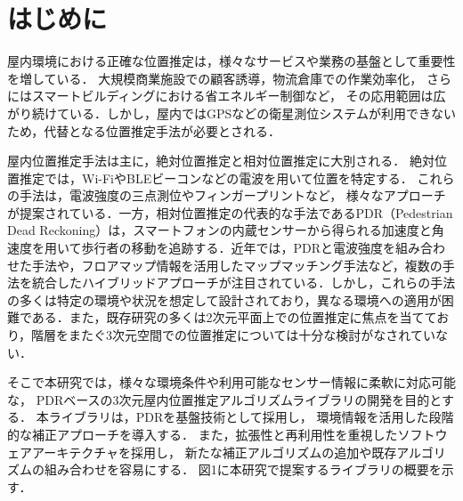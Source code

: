\documentclass[a4paper, 10pt, twocolumn]{jarticle}
\begin{document}


\section{はじめに}

屋内環境における正確な位置推定は，様々なサービスや業務の基盤として重要性を増している．
大規模商業施設での顧客誘導，物流倉庫での作業効率化，
さらにはスマートビルディングにおける省エネルギー制御など，
その応用範囲は広がり続けている．しかし，屋内ではGPSなどの衛星測位システムが利用できないため，代替となる位置推定手法が必要とされる．

屋内位置推定手法は主に，絶対位置推定と相対位置推定に大別される．
絶対位置推定では，Wi-FiやBLEビーコンなどの電波を用いて位置を特定する．
これらの手法は，電波強度の三点測位やフィンガープリントなど，
様々なアプローチが提案されている．一方，相対位置推定の代表的な手法であるPDR（Pedestrian Dead Reckoning）は，スマートフォンの内蔵センサーから得られる加速度と角速度を用いて歩行者の移動を追跡する．近年では，PDRと電波強度を組み合わせた手法や，フロアマップ情報を活用したマップマッチング手法など，複数の手法を統合したハイブリッドアプローチが注目されている．しかし，これらの手法の多くは特定の環境や状況を想定して設計されており，異なる環境への適用が困難である．また，既存研究の多くは2次元平面上での位置推定に焦点を当てており，階層をまたぐ3次元空間での位置推定については十分な検討がなされていない．

そこで本研究では，様々な環境条件や利用可能なセンサー情報に柔軟に対応可能な，
PDRベースの3次元屋内位置推定アルゴリズムライブラリの開発を目的とする．
本ライブラリは，PDRを基盤技術として採用し，
環境情報を活用した段階的な補正アプローチを導入する．
また，拡張性と再利用性を重視したソフトウェアアーキテクチャを採用し，
新たな補正アルゴリズムの追加や既存アルゴリズムの組み合わせを容易にする．
図1に本研究で提案するライブラリの概要を示す．
\end{document}

